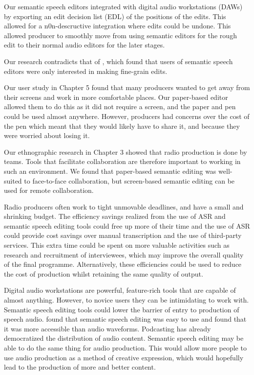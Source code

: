 Our semantic speech editors integrated with digital audio workstations (DAWs) by exporting an edit decision list (EDL)
of the positions of the edits. This allowed for a n0n-descructive integration where edits could be undone. This allowed
producer to smoothly move from using semantic editors for the rough edit to their normal audio editors for the later
stages.

Our research contradicts that of \citet{Sivaraman2016}, which found that users of semantic speech editors were only
interested in making fine-grain edits.

Our user study in Chapter 5 found that many producers wanted to get away from their screens and work in more
comfortable places. Our paper-based editor allowed them to do this as it did not require a screen, and the paper and
pen could be used almost anywhere. However, producers had concerns over the cost of the pen which meant that they would
likely have to share it, and because they were worried about losing it.

Our ethnographic research in Chapter 3 showed that radio production is done by teams. Tools that facilitate
collaboration are therefore important to working in such an environment. We found that paper-based semantic editing was
well-suited to face-to-face collaboration, but screen-based semantic editing can be used for remote collaboration.

Radio producers often work to tight unmovable deadlines, and have a small and shrinking budget. The efficiency savings
realized from the use of ASR and semantic speech editing tools could free up more of their time and the use of ASR
could provide cost savings over manual transcription and the use of third-party services. This extra time could be
spent on more valuable activities such as research and recruitment of interviewees, which may improve the overall
quality of the final programme. Alternatively, these efficiencies could be used to reduce the cost of production whilst
retaining the same quality of output.

Digital audio workstations are powerful, feature-rich tools that are capable of almost anything. However, to novice
users they can be intimidating to work with. Semantic speech editing tools could lower the barrier of entry to
production of speech audio. \citet{Yoon2014} found that semantic speech editing was easy to use and
\citet{Sivaraman2016} found that it was more accessible than audio waveforms. Podcasting has already democratized the
distribution of audio content. Semantic speech editing may be able to do the same thing for audio production. This
would allow more people to use audio production as a method of creative expression, which would hopefully lead to the
production of more and better content.

